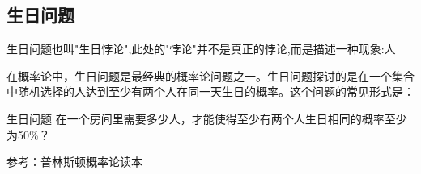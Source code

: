 
\subsection{生日问题}

生日问题也叫"生日悖论",此处的"悖论"并不是真正的悖论,而是描述一种现象:人

在概率论中，生日问题是最经典的概率论问题之一。生日问题探讨的是在一个集合中随机选择的人达到至少有两个人在同一天生日的概率。这个问题的常见形式是：

\begin{example}{生日问题}
在一个房间里需要多少人，才能使得至少有两个人生日相同的概率至少为50\%？
\end{example}

 



参考：普林斯顿概率论读本